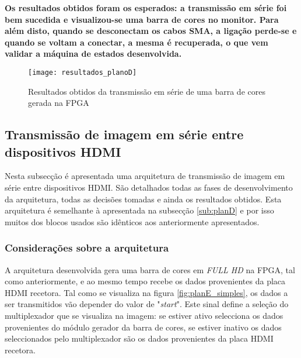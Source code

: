 \begin{center}
	\lrboxbrace[\Vert][\Vert] {}
	{\textbf{Os resultados obtidos foram os esperados: a transmissão em série foi bem sucedida e visualizou-se uma barra de cores no monitor. Para além disto, quando se desconectam os cabos SMA, a ligação perde-se e quando se voltam a conectar, a mesma é recuperada, o que vem validar a máquina de estados desenvolvida.}}
\end{center}

\begin{figure}[h!]
	\begin{center}
		\leavevmode
		\texttt{[image: resultados\_planoD]}
		\captionsetup{width=1.0\linewidth}
		\caption[Resultados obtidos da transmissão em série de uma barra de cores gerada na FPGA]{Resultados obtidos da transmissão em série de uma barra de cores gerada na FPGA}
		\label{fig:planD_resultados}
	\end{center}
\end{figure}



\subsection{Transmissão de imagem em série entre dispositivos HDMI} \label{sub:planE}

Nesta subsecção é apresentada uma arquitetura de transmissão de imagem em série entre dispositivos HDMI. São detalhados todas as fases de desenvolvimento da arquitetura, todas as decisões tomadas e ainda os resultados obtidos. Esta arquitetura é semelhante à apresentada na subsecção \ref{sub:planD} e por isso muitos dos blocos usados são idênticos aos anteriormente apresentados.

\subsubsection{Considerações sobre a arquitetura} \label{subsub:planE_considerações}

A arquitetura desenvolvida gera uma barra de cores em \textit{FULL HD} na FPGA, tal como anteriormente, e ao mesmo tempo recebe os dados provenientes da placa HDMI recetora. Tal como se visualiza na figura \ref{fig:planE_simples}, os dados a ser transmitidos vão depender do valor de "\textit{start}". Este sinal define a seleção do multiplexador que se visualiza na imagem: se estiver ativo selecciona os dados provenientes do módulo gerador da barra de cores, se estiver inativo os dados seleccionados pelo multiplexador são os dados provenientes da placa HDMI recetora.

